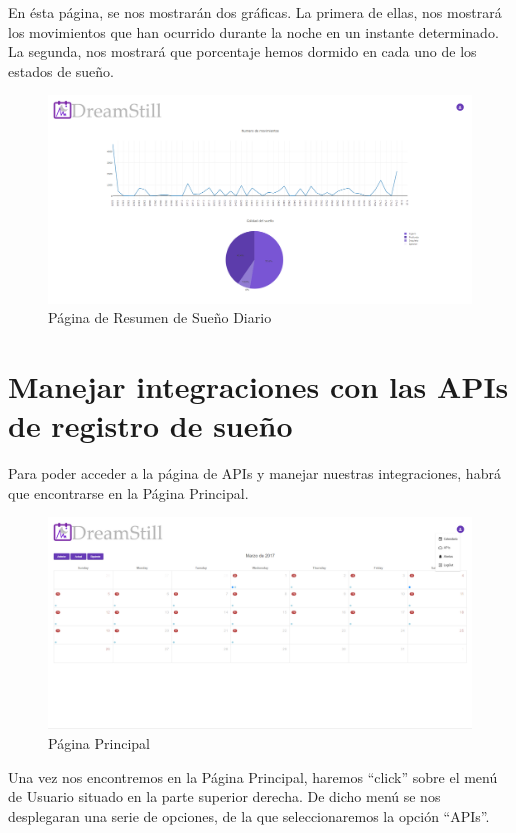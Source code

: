\documentclass[11pt,openany]{book}
\begin{document}
En ésta página, se nos mostrarán dos gráficas. La primera de ellas, nos mostrará los movimientos que han ocurrido durante la noche en un instante determinado. La segunda, nos mostrará que porcentaje hemos dormido en cada uno de los estados de sueño.

\begin{figure}[H]
\centering
\includegraphics[totalheight=6cm]{manualUsuario/resumenSue_oDiario.png}
\caption{Página de Resumen de Sueño Diario}
\end{figure}

\section{Manejar integraciones con las APIs de registro de sueño}

Para poder acceder a la página de APIs y manejar nuestras integraciones, habrá que encontrarse en la Página Principal.

\begin{figure}[H]
\centering
\includegraphics[totalheight=6cm]{manualUsuario/paginaPrincipal.png}
\caption{Página Principal}
\end{figure}

Una vez nos encontremos en la Página Principal, haremos ``click'' sobre el menú de Usuario situado en la parte superior derecha. De dicho menú se nos desplegaran una serie de opciones, de la que seleccionaremos la opción ``APIs''.
\end{document}
